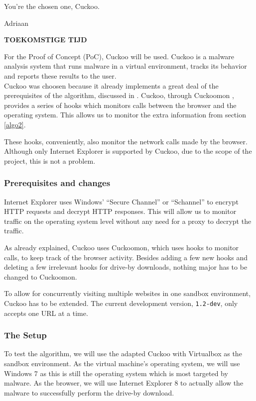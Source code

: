 \epigraph{You're the chosen one, Cuckoo.}{Adriaan}

\textbf{TOEKOMSTIGE TIJD}

For the Proof of Concept (PoC), Cuckoo \cite{cuckoo} will be used. Cuckoo is a malware analysis system that runs malware in a virtual environment, tracks its behavior and reports these results to the user.\\

Cuckoo was choosen because it already implements a great deal of the prerequisites of the algorithm, discussed in . Cuckoo, through Cuckoomon \cite{cuckoomon}, provides a series of hooks which monitors calls between the browser and the operating system. This allows us to monitor the extra information from section \ref{algo2}. 

These hooks, conveniently, also monitor the network calls made by the browser. Although only Internet Explorer is supported by Cuckoo, due to the scope of the project, this is not a problem.

\subsubsection{Prerequisites and changes}

Internet Explorer uses Windows' ``Secure Channel'' or ``Schannel'' \cite{schannel} to encrypt HTTP requests and decrypt HTTP responses. This will allow us to monitor traffic on the operating system level without any need for a proxy to decrypt the traffic.

As already explained, Cuckoo uses Cuckoomon, which uses hooks to monitor calls, to keep track of the browser activity. Besides adding a few new hooks and deleting a few irrelevant hooks for drive-by downloads, nothing major has to be changed to Cuckoomon.

To allow for concurrently visiting multiple websites in one sandbox environment, Cuckoo has to be extended. The current development version, \texttt{1.2-dev},  only accepts one URL at a time. 

\subsubsection{The Setup}

To test the algorithm, we will use the adapted Cuckoo with Virtualbox as the sandbox environment. As the virtual machine's operating system, we will use Windows 7 as this is still the operating system which is most targeted by malware. As the browser, we will use Internet Explorer 8 to actually allow the malware to successfully perform the drive-by download.

